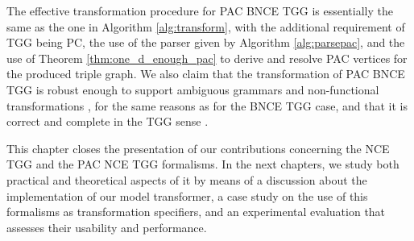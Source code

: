 The effective transformation procedure for PAC BNCE TGG is essentially the same as the one in Algorithm \ref{alg:transform}, with the additional requirement of TGG being PC, the use of the parser given by Algorithm \ref{alg:parsepac}, and the use of Theorem \ref{thm:one_d_enough_pac} to derive and resolve PAC vertices for the produced triple graph. We also claim that the transformation of PAC BNCE TGG is robust enough to support ambiguous grammars and non-functional transformations \cite{Hermann2010}, for the same reasons as for the BNCE TGG case, and that it is correct and complete in the TGG sense \cite{Hermann2013}.

This chapter closes the presentation of our contributions concerning the NCE TGG and the PAC NCE TGG formalisms. In the next chapters, we study both practical and theoretical aspects of it by means of a discussion about the implementation of our model transformer, a case study on the use of this formalisms as transformation specifiers, and an experimental evaluation that assesses their usability and performance.